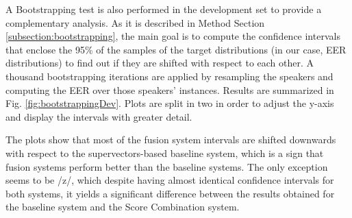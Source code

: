 A Bootstrapping test is also performed in the development set to provide a complementary
analysis. As it is described in Method Section \ref{subsection:bootstrapping}, the main goal
is to compute the confidence intervals that enclose the 95\% of the samples of
the target distributions (in our case, EER distributions) to find out if they are shifted
with respect to each other. A thousand bootstrapping iterations are applied by resampling
the speakers and computing the EER over those speakers' instances.
Results are summarized in Fig. \ref{fig:bootstrappingDev}. Plots are split in two in order to adjust the y-axis and display the intervals
with greater detail.

The plots show that most of the fusion system intervals are shifted downwards with
respect to the supervectors-based baseline system,
which is a sign that fusion systems perform better than the
baseline systems.
The only exception seems to be /z/, which
despite having almost identical confidence intervals for both systems,
it yields a significant difference
between the results obtained for the baseline system and the Score Combination system.


